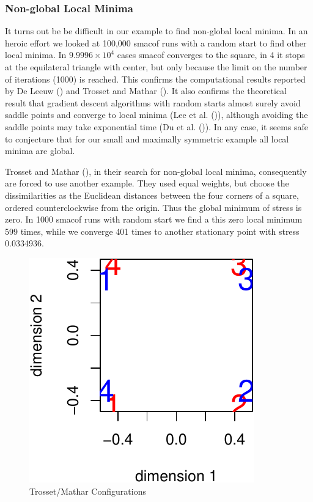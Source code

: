 \documentclass[
  12pt,
  letterpaper,
  DIV=11,
  numbers=noendperiod]{scrreprt}
\theoremstyle{remark}
\begin{document}
\subsubsection{Non-global Local Minima}\label{non-global-local-minima}

It turns out be be difficult in our example to find non-global local
minima. In an heroic effort we looked at 100,000 smacof runs with a
random start to find other local minima. In
\ensuremath{9.9996\times 10^{4}} cases smacof converges to the square,
in 4 it stops at the equilateral triangle with center, but only because
the limit on the number of iterations (1000) is reached. This confirms
the computational results reported by De Leeuw
() and Trosset and Mathar
(). It also confirms the
theoretical\\
result that gradient descent algorithms with random starts almost surely
avoid saddle points and converge to local minima (Lee et al.
()), although
avoiding the saddle points may take exponential time (Du et al.
()). In any case,
it seems safe to conjecture that for our small and maximally symmetric
example all local minima are global.

Trosset and Mathar (), in their
search for non-global local minima, consequently are forced to use
another example. They used equal weights, but choose the dissimilarities
as the Euclidean distances between the four corners of a square, ordered
counterclockwise from the origin. Thus the global minimum of stress is
zero. In 1000 smacof runs with random start we find a this zero local
minimum 599 times, while we converge 401 times to another stationary
point with stress 0.0334936.

\begin{figure}[H]

{\centering \includegraphics{properties_files/figure-pdf/tmzplot-1.pdf}

}

\caption{Trosset/Mathar Configurations}

\end{figure}%
\end{document}
